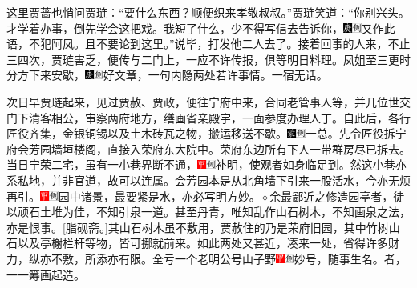 {{{{{{{{{这里贾蔷也悄问贾琏：“要什么东西？顺便织来孝敬叔叔。”贾琏笑道：“你别兴头。才学着办事，倒先学会这把戏。我短了什么，少不得写信去告诉你，{\includegraphics[width=3mm]{../Images/00004}\includegraphics[width=3mm]{../Images/00011}\footnotesize \kaishu 又作此语，不犯阿凤。}且不要论到这里。”说毕，打发他二人去了。接着回事的人来，不止三四次，贾琏害乏，便传与二门上，一应不许传报，俱等明日料理。凤姐至三更时分方下来安歇，{\includegraphics[width=3mm]{../Images/00004}\includegraphics[width=3mm]{../Images/00011}\footnotesize \kaishu 好文章，一句内隐两处若许事情。}一宿无话。

次日早贾琏起来，见过贾赦、贾政，便往宁府中来，合同老管事人等，并几位世交门下清客相公，审察两府地方，缮画省亲殿宇，一面参度办理人丁。自此后，各行匠役齐集，金银铜锡以及土木砖瓦之物，搬运移送不歇。{\includegraphics[width=3mm]{../Images/00006}\includegraphics[width=3mm]{../Images/00011}\footnotesize \kaishu 一总。}先令匠役拆宁府会芳园墙垣楼阁，直接入荣府东大院中。荣府东边所有下人一带群房尽已拆去。当日宁荣二宅，虽有一小巷界断不通，{\includegraphics[width=3mm]{../Images/00002}\includegraphics[width=3mm]{../Images/00011}\footnotesize \kaishu 补明，使观者如身临足到。}然这小巷亦系私地，并非官道，故可以连属。会芳园本是从北角墙下引来一股活水，今亦无烦再引。{\includegraphics[width=3mm]{../Images/00002}\includegraphics[width=3mm]{../Images/00011}\footnotesize \kaishu 园中诸景，最要紧是水，亦必写明方妙。{$\diamond$}余最鄙近之修造园亭者，徒以顽石土堆为佳，不知引泉一道。甚至丹青，唯知乱作山石树木，不知画泉之法，亦是恨事。{[}脂砚斋。{]}}其山石树木虽不敷用，贾赦住的乃是荣府旧园，其中竹树山石以及亭榭栏杆等物，皆可挪就前来。如此两处又甚近，凑来一处，省得许多财力，纵亦不敷，所添亦有限。全亏一个老明公号山子野{\includegraphics[width=3mm]{../Images/00002}\includegraphics[width=3mm]{../Images/00011}\footnotesize \kaishu 妙号，随事生名。}者，一一筹画起造。

}}}}}}}}}
